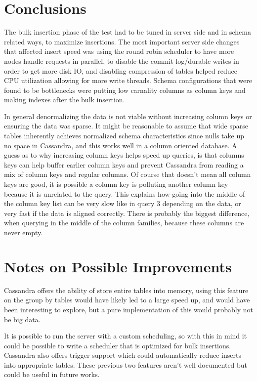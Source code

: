 \documentclass[letterpaper]{article}
\begin{document}
\section{Conclusions}

The bulk insertion phase of the test had to be tuned in server side and in schema related ways, to maximize
insertions.
The most important server side changes that affected insert speed was using the round
robin scheduler to have more nodes handle requests in parallel, to disable
the commit log/durable writes in order to get more disk IO, and disabling compression of tables helped
reduce CPU utilization allowing for more write threads. Schema configurations that were found to be
bottlenecks were putting low carnality columns as column keys and making indexes after the bulk 
insertion.

In general denormalizing the data is not viable without increasing column keys or ensuring the data
was sparse. It might be reasonable to assume that wide sparse tables inherently achieves normalized
schema characteristics since nulls take up no space in Cassandra, and this works well in a column 
oriented database. 
A guess as to why increasing column keys helps speed up queries, is that columns keys can help buffer
earlier column keys and prevent Cassandra from reading a mix of column keys and regular columns.
Of course that doesn't mean all column keys are good, it is possible a column key is polluting
another column key because it is unrelated to the query. This explains how going into the middle of
the column key list can be very slow like in query 3 depending on the data, or very fast if the data
is aligned correctly. There is probably the biggest difference, when querying in the middle of the
column families, because these columns are never empty. 

\section{Notes on Possible Improvements}

Cassandra offers the ability of store entire tables into memory, using this feature on the
group by tables would have likely led to a large speed up, and would have been
interesting to explore, but a pure implementation of this would probably not be big data.

It is possible to run the server with a custom scheduling, so with this in mind it could be possible
to write a scheduler that is optimized for bulk insertions.
Cassandra also offers trigger support which could automatically reduce inserts into
appropriate tables. These previous two features aren't well documented but could be useful in future
works.
\end{document}
